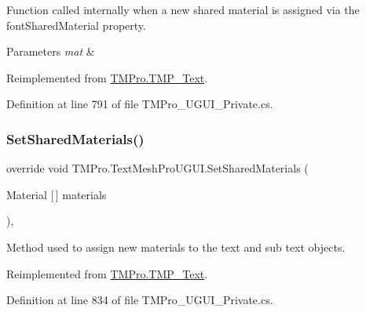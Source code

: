 Function called internally when a new shared material is assigned via the font\+Shared\+Material property. 


\begin{DoxyParams}{Parameters}
{\em mat} & \\
\hline
\end{DoxyParams}


Reimplemented from \mbox{\hyperlink{class_t_m_pro_1_1_t_m_p___text_abccb3148b9e3fceee9b80807d75c0196}{T\+M\+Pro.\+T\+M\+P\+\_\+\+Text}}.



Definition at line 791 of file T\+M\+Pro\+\_\+\+U\+G\+U\+I\+\_\+\+Private.\+cs.

\mbox{\label{class_t_m_pro_1_1_text_mesh_pro_u_g_u_i_a9ca66d291221a6ee6a9aeaf7944a647d}} 
\subsubsection{\texorpdfstring{SetSharedMaterials()}{SetSharedMaterials()}}
{\footnotesize\ttfamily override void T\+M\+Pro.\+Text\+Mesh\+Pro\+U\+G\+U\+I.\+Set\+Shared\+Materials (\begin{DoxyParamCaption}\item[{Material \mbox{[}$\,$\mbox{]}}]{materials }\end{DoxyParamCaption})\hspace{0.3cm}{\ttfamily [protected]}, {\ttfamily [virtual]}}



Method used to assign new materials to the text and sub text objects. 



Reimplemented from \mbox{\hyperlink{class_t_m_pro_1_1_t_m_p___text_abd5a99f8e985bc1808f4dee6b268c7e1}{T\+M\+Pro.\+T\+M\+P\+\_\+\+Text}}.



Definition at line 834 of file T\+M\+Pro\+\_\+\+U\+G\+U\+I\+\_\+\+Private.\+cs.

\mbox{\label{class_t_m_pro_1_1_text_mesh_pro_u_g_u_i_acc18f45edf09f79d04d6a9e461633d7c}} 

